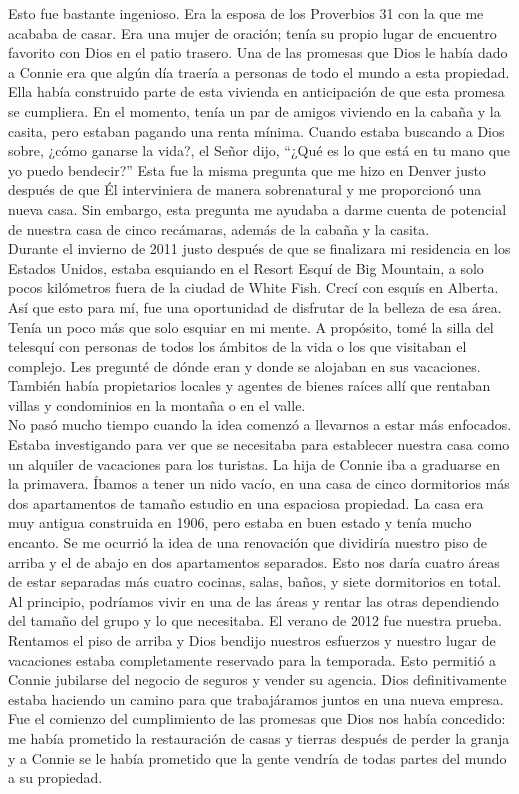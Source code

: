 \documentclass[twoside, 12pt]{book}
\begin{document}
Esto fue bastante ingenioso. Era la esposa de los Proverbios 31 con la que me acababa de casar. Era una mujer de oración; tenía su propio lugar de encuentro favorito con Dios en el patio trasero. Una de las promesas que Dios le había dado a Connie era que algún día traería a personas de todo el mundo a esta propiedad. Ella había construido parte de esta vivienda en anticipación de que esta promesa se cumpliera. En el momento, tenía un par de amigos viviendo en la cabaña y la casita, pero estaban pagando una renta mínima. Cuando estaba buscando a Dios sobre, ¿cómo ganarse la vida?, el Señor dijo, “¿Qué es lo que está en tu mano que yo puedo bendecir?” Esta fue la misma pregunta que me hizo en Denver justo después de que Él interviniera de manera sobrenatural y me proporcionó una nueva casa. Sin embargo, esta pregunta me ayudaba a darme cuenta de potencial de nuestra casa de cinco recámaras, además de la cabaña y la casita.\\

Durante el invierno de 2011 justo después de que se finalizara mi residencia en los Estados Unidos, estaba esquiando en el Resort Esquí de Big Mountain, a solo pocos kilómetros fuera de la ciudad de White Fish. Crecí con esquís en Alberta. Así que esto para mí, fue una oportunidad de disfrutar de la belleza de esa área.  Tenía un poco más que solo esquiar en mi mente. A propósito, tomé la silla del telesquí con personas de todos los ámbitos de la vida o los que visitaban el complejo. Les pregunté de dónde eran y donde se alojaban en sus vacaciones. También había propietarios locales y agentes de bienes raíces allí que rentaban villas y condominios en la montaña o en el valle.\\

No pasó mucho tiempo cuando la idea comenzó a llevarnos a estar más enfocados. Estaba investigando para ver que se necesitaba para establecer nuestra casa como un alquiler de vacaciones para los turistas. La hija de Connie iba a graduarse en la primavera. Íbamos a tener un nido vacío, en una casa de cinco dormitorios más dos apartamentos de tamaño estudio en una espaciosa propiedad. La casa era muy antigua construida en 1906, pero estaba en buen estado y tenía mucho encanto. Se me ocurrió la idea de una renovación que dividiría nuestro piso de arriba y el de abajo en dos apartamentos separados. Esto nos daría cuatro áreas de estar separadas más cuatro cocinas, salas, baños, y siete dormitorios en total. Al principio, podríamos vivir en una de las áreas y rentar las otras dependiendo del tamaño del grupo y lo que necesitaba. El verano de 2012 fue nuestra prueba. Rentamos el piso de arriba y Dios bendijo nuestros esfuerzos y nuestro lugar de vacaciones estaba completamente reservado para la temporada. Esto permitió a Connie jubilarse del negocio de seguros y vender su agencia. Dios definitivamente estaba haciendo un camino para que trabajáramos juntos en una nueva empresa. Fue el comienzo del cumplimiento de las promesas que Dios nos había concedido: me había prometido la restauración de casas y tierras después de perder la granja y a Connie se le había prometido que la gente vendría de todas partes del mundo a su propiedad.\\
\end{document}

